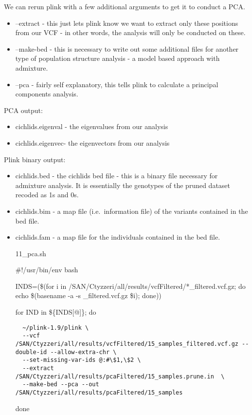 \documentclass[
]{article}
\begin{document}
We can rerun plink with a few additional arguments to get it to conduct
a PCA.

\begin{itemize}
\item
  --extract - this just lets plink know we want to extract only these
  positions from our VCF - in other words, the analysis will only be
  conducted on these.
\item
  --make-bed - this is necessary to write out some additional files for
  another type of population structure analysis - a model based approach
  with admixture.
\item
  --pca - fairly self explanatory, this tells plink to calculate a
  principal components analysis.
\end{itemize}

PCA output:

\begin{itemize}
\item
  cichlids.eigenval - the eigenvalues from our analysis
\item
  cichlids.eigenvec- the eigenvectors from our analysis
\end{itemize}

Plink binary output:

\begin{itemize}
\item
  cichlids.bed - the cichlids bed file - this is a binary file necessary
  for admixture analysis. It is essentially the genotypes of the pruned
  dataset recoded as 1s and 0s.
\item
  cichlids.bim - a map file (i.e.~information file) of the variants
  contained in the bed file.
\item
  cichlids.fam - a map file for the individuals contained in the bed
  file.

  11\_pca.sh

  \#!/usr/bin/env bash

  INDS=(\$(for i in
  /SAN/Ctyzzeri/all/results/vcfFiltered/*\_filtered.vcf.gz; do echo
  \$(basename -a -s \_filtered.vcf.gz \$i); done))

  for IND in \$\{INDS{[}@{]}\}; do

\begin{verbatim}
  ~/plink-1.9/plink \
  --vcf /SAN/Ctyzzeri/all/results/vcfFiltered/15_samples_filtered.vcf.gz --double-id --allow-extra-chr \
  --set-missing-var-ids @:#\$1,\$2 \
  --extract /SAN/Ctyzzeri/all/results/pcaFiltered/15_samples.prune.in  \
  --make-bed --pca --out /SAN/Ctyzzeri/all/results/pcaFiltered/15_samples
\end{verbatim}

  done
\end{itemize}
\end{document}
